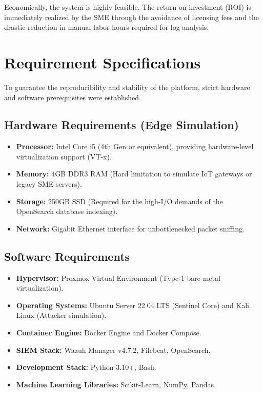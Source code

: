 \documentclass[12pt, a4paper]{report}
\begin{document}
	Economically, the system is highly feasible. The return on investment (ROI) is immediately realized by the SME through the avoidance of licensing fees and the drastic reduction in manual labor hours required for log analysis.
	
	\section{Requirement Specifications}
	To guarantee the reproducibility and stability of the platform, strict hardware and software prerequisites were established.
	
	\subsection{Hardware Requirements (Edge Simulation)}
	\begin{itemize}
		\item \textbf{Processor:} Intel Core i5 (4th Gen or equivalent), providing hardware-level virtualization support (VT-x).
		\item \textbf{Memory:} 4GB DDR3 RAM (Hard limitation to simulate IoT gateways or legacy SME servers).
		\item \textbf{Storage:} 250GB SSD (Required for the high-I/O demands of the OpenSearch database indexing).
		\item \textbf{Network:} Gigabit Ethernet interface for unbottlenecked packet sniffing.
	\end{itemize}
	
	\subsection{Software Requirements}
	\begin{itemize}
		\item \textbf{Hypervisor:} Proxmox Virtual Environment (Type-1 bare-metal virtualization).
		\item \textbf{Operating Systems:} Ubuntu Server 22.04 LTS (Sentinel Core) and Kali Linux (Attacker simulation).
		\item \textbf{Container Engine:} Docker Engine and Docker Compose.
		\item \textbf{SIEM Stack:} Wazuh Manager v4.7.2, Filebeat, OpenSearch.
		\item \textbf{Development Stack:} Python 3.10+, Bash.
		\item \textbf{Machine Learning Libraries:} Scikit-Learn, NumPy, Pandas.
	\end{itemize}
	
\end{document}
